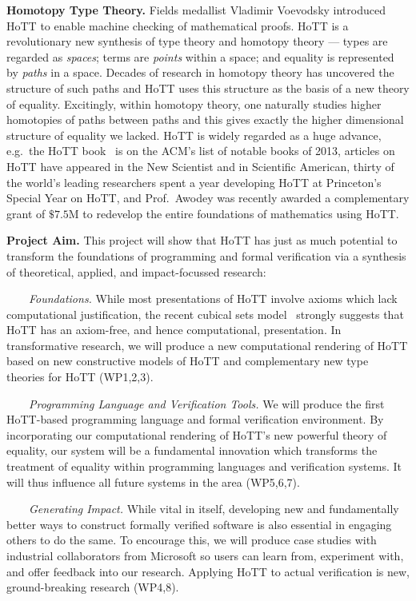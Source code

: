 \documentclass[a4paper,11pt]{article}
\newcommand{\eg}{{e.g.}\ }
\begin{document}
{\bf Homotopy Type Theory.} Fields medallist Vladimir Voevodsky
introduced HoTT to enable machine checking of mathematical proofs.
HoTT is a revolutionary new synthesis of type theory and homotopy
theory --- types are regarded as \emph{spaces}; terms are
\emph{points} within a space; and equality is represented by
\emph{paths} in a space. Decades of research in homotopy theory has
uncovered the structure of such paths and HoTT uses this structure as
the basis of a new theory of equality. Excitingly, within homotopy
theory, one naturally studies higher homotopies of paths between paths
and this gives exactly the higher dimensional structure of equality we
lacked.  HoTT is widely regarded as a huge advance, \eg the HoTT
book~\cite{hott-book} is on the ACM's list of notable books of 2013,
articles on HoTT have appeared in the New Scientist and in Scientific
American, thirty of the world's leading researchers spent a year
developing HoTT at Princeton's Special Year on HoTT, and Prof.\ Awodey
was recently awarded a complementary grant of $\$ 7.5$M to redevelop
the entire foundations of mathematics using HoTT.


{\bf Project Aim.}  This project will show that HoTT has just as much
potential to transform the foundations of programming and formal
verification via a synthesis of theoretical, applied, and
impact-focussed research:

$\;\;\; \;\;\;$ {\em Foundations.} While most presentations of HoTT
involve axioms which lack computational justification, the recent
cubical sets model~\cite{BezemM:cubsmt,nominal} strongly suggests that
HoTT has an axiom-free, and hence computational, presentation. In
transformative research, we will produce a new computational rendering
of HoTT based on new constructive models of HoTT and complementary new
type theories for HoTT (WP1,2,3).

$\;\;\;\;\;\;$ {\em Programming Language and Verification Tools.}  
We will produce the first HoTT-based
programming language and formal verification
environment. By incorporating our computational rendering of HoTT's new
powerful theory of equality, our system will be a fundamental
innovation which transforms the treatment of equality within
programming languages and verification systems. It will thus influence all
future systems in the area (WP5,6,7).

$\;\;\;\;\;\;$ {\em Generating Impact.} 
While vital in itself, developing new and fundamentally better ways to
construct formally verified software is also essential in
engaging others to do the same. To encourage this, we will produce case
studies with industrial collaborators from Microsoft so users can
learn from, experiment with, and offer feedback into our research. Applying HoTT to
actual verification is new,  ground-breaking research (WP4,8).
\end{document}

